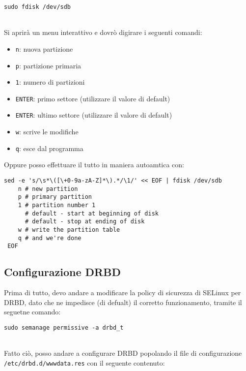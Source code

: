 \begin{lstlisting}[style=cmd]
 sudo fdisk /dev/sdb
\end{lstlisting}
\ \\
Si aprir\`{a} un menu interattivo e dovr\`{o} digirare i seguenti comandi:

\begin{itemize}
	\item \lstinline[style=cmd]|n|: nuova partizione
	\item \lstinline[style=cmd]|p|: partizione primaria
	\item \lstinline[style=cmd]|1|: numero di partizioni
	\item \lstinline[style=cmd]|ENTER|: primo settore (utilizzare il valore di default)
	\item \lstinline[style=cmd]|ENTER|: ultimo settore (utilizzare il valore di default)
	\item \lstinline[style=cmd]|w|: scrive le modifiche
	\item \lstinline[style=cmd]|q|: esce dal programma
\end{itemize}
\pagebreak
Oppure posso effettuare il tutto in maniera autoamtica con:

\begin{lstlisting}[style=cmd]
 sed -e 's/\s*\([\+0-9a-zA-Z]*\).*/\1/' << EOF | fdisk /dev/sdb
    n # new partition
    p # primary partition
    1 # partition number 1
      # default - start at beginning of disk 
      # default - stop at ending of disk 
    w # write the partition table
    q # and we're done
 EOF
\end{lstlisting}

\subsection{Configurazione DRBD}

Prima di tutto, devo andare a modificare la policy di sicurezza di SELinux per DRBD, dato che ne impedisce (di defualt) il corretto funzionamento, tramite il seguetne comando:

\begin{lstlisting}[style=cmd]
 sudo semanage permissive -a drbd_t
\end{lstlisting}
\ \\
Fatto ci\`{o}, posso andare a configurare DRBD popolando il file di configurazione \lstinline[style=cmd]|/etc/drbd.d/wwwdata.res| con il seguente contenuto:

